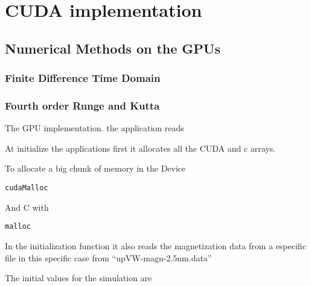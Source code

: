 
\chapter{CUDA implementation} %

\label{CUDA implementation} %




\section{Numerical Methods on the GPUs}


\subsection{Finite Difference Time Domain}


\subsection{Fourth order Runge and Kutta}

The GPU implementation. the application reads

At initialize the applications first it allocates all the CUDA and c arrays.

To allocate a big chunk of memory in the Device

\begin{lstlisting}[frame=none]
cudaMalloc
\end{lstlisting}
And C with

\begin{lstlisting}[frame=none]
malloc
\end{lstlisting}

In the initialization function it also reads the magnetization data from a especific file in this specific case from ``upVW-magn-2.5nm.data''


The initial values for the simulation are

